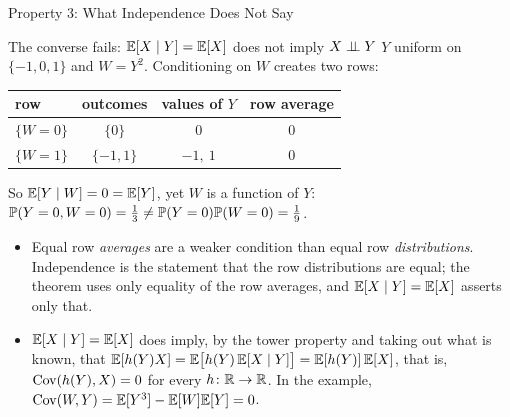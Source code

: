 \begin{frame}{Property 3: What Independence Does Not Say}
  \small
  \begin{block}{The converse fails: $\mathbb{E}[X\mid Y]=\mathbb{E}[X]$ does not imply $X\perp\!\!\!\perp Y$}
    $Y$ uniform on $\{-1,0,1\}$ and $W=Y^2$. Conditioning on $W$ creates two rows:
    \begin{center}
      \renewcommand{\arraystretch}{1.2}
      \begin{tabular}{@{}lccc@{}}
        \toprule
        row & outcomes & values of $Y$ & row average \\
        \midrule
        $\{W=0\}$ & $\{0\}$ & $0$ & $0$ \\
        $\{W=1\}$ & $\{-1,1\}$ & $-1,\ 1$ & $0$ \\
        \bottomrule
      \end{tabular}
    \end{center}
    So $\mathbb{E}[Y\mid W]=0=\mathbb{E}[Y]$, yet $W$ is a function of $Y$: $\mathbb{P}(Y=0,W=0)=\tfrac13\ne\mathbb{P}(Y=0)\mathbb{P}(W=0)=\tfrac19$.
  \end{block}
  \begin{itemize}
    \item Equal row \emph{averages} are a weaker condition than equal row \emph{distributions}. Independence is the statement that the row distributions are equal; the theorem uses only equality of the row averages, and $\mathbb{E}[X\mid Y]=\mathbb{E}[X]$ asserts only that.
    \item $\mathbb{E}[X\mid Y]=\mathbb{E}[X]$ does imply, by the tower property and taking out what is known, that $\mathbb{E}[h(Y)X]=\mathbb{E}\big[h(Y)\,\mathbb{E}[X\mid Y]\big]=\mathbb{E}[h(Y)]\,\mathbb{E}[X]$, that is, $\operatorname{Cov}(h(Y),X)=0$ for every $h\colon\mathbb{R}\to\mathbb{R}$. In the example, $\operatorname{Cov}(W,Y)=\mathbb{E}[Y^3]-\mathbb{E}[W]\mathbb{E}[Y]=0$.
  \end{itemize}
\end{frame}

